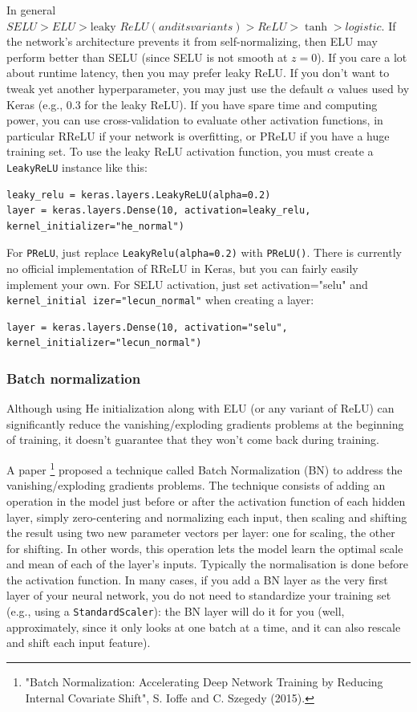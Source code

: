 In general $SELU > ELU > \text{leaky }ReLU (and its variants) > ReLU > \tanh > logistic$. If the network's architecture prevents it from self-normalizing, then ELU may perform better than SELU (since SELU is not smooth at $z = 0$). If you care a lot about runtime latency, then you may prefer leaky ReLU. If you don't want to tweak yet another hyperparameter, you may just use the default $\alpha$ values used by Keras (e.g., $0.3$ for the leaky ReLU). If you have spare time and computing power, you can use cross-validation to evaluate other activation functions, in particular RReLU if your network is overfitting, or PReLU if you have a huge training set.
To use the leaky ReLU activation function, you must create a \lstinline+LeakyReLU+ instance like this:
\begin{lstlisting}
leaky_relu = keras.layers.LeakyReLU(alpha=0.2)
layer = keras.layers.Dense(10, activation=leaky_relu, kernel_initializer="he_normal")
\end{lstlisting}
For \lstinline+PReLU+, just replace \lstinline+LeakyRelu(alpha=0.2)+ with \lstinline+PReLU()+.
There is currently no official implementation of RReLU in Keras, but you can fairly easily implement your own. For SELU activation, just set activation="selu" and \lstinline+kernel_initial izer="lecun_normal"+ when creating a layer:
\begin{lstlisting}
layer = keras.layers.Dense(10, activation="selu", kernel_initializer="lecun_normal")
\end{lstlisting}

\subsubsection{Batch normalization}
Although using He initialization along with ELU (or any variant of ReLU) can significantly reduce the vanishing/exploding gradients problems at the beginning of training, it doesn't guarantee that they won't come back during training.

A paper \footnote{"Batch Normalization: Accelerating Deep Network Training by Reducing Internal Covariate Shift", S. Ioffe and C. Szegedy (2015).} proposed a technique called Batch Normalization (BN) to address the vanishing/exploding gradients problems. The technique consists of adding an operation in the model just before or after the activation function of each hidden layer, simply zero-centering and normalizing each input, then scaling and shifting the result using two new parameter vectors per layer: one for scaling, the other for shifting. In other words, this operation lets the model learn the optimal scale and mean of each of the layer's inputs. Typically the normalisation is done before the activation function. In many cases, if you add a BN layer as the very first layer of your neural network, you do not need to standardize your training set (e.g., using a \lstinline+StandardScaler+): the BN layer will do it for you (well, approximately, since it only looks at one batch at a time, and it can also rescale and shift each input feature).

